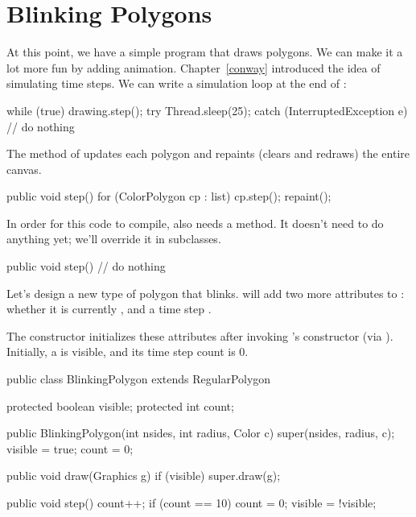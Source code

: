 

\section{Blinking Polygons}
\label{sec:blinking}

At this point, we have a simple program that draws polygons.
We can make it a lot more fun by adding animation.
Chapter~\ref{conway} introduced the idea of simulating time steps.
We can write a simulation loop at the end of :

\begin{code}
while (true) {
    drawing.step();
    try {
        Thread.sleep(25);
    } catch (InterruptedException e) {
        // do nothing
    }
}
\end{code}

The  method of  updates each polygon and repaints (clears and redraws) the entire canvas.

\begin{code}
public void step() {
    for (ColorPolygon cp : list) {
        cp.step();
    }
    repaint();
}
\end{code}

In order for this code to compile,  also needs a  method.
It doesn't need to do anything yet; we'll override it in subclasses.

\begin{code}
public void step() {
    // do nothing
}
\end{code}

Let's design a new type of polygon that blinks.
 will add two more attributes to : whether it is currently , and a time step .

The constructor initializes these attributes after invoking 's constructor (via ).
Initially, a  is visible, and its time step count is 0.

\begin{code}
public class BlinkingPolygon extends RegularPolygon {
    protected boolean visible;
    protected int count;

    public BlinkingPolygon(int nsides, int radius, Color c) {
        super(nsides, radius, c);
        visible = true;
        count = 0;
    }

    public void draw(Graphics g) {
        if (visible) {
            super.draw(g);
        }
    }

    public void step() {
        count++;
        if (count == 10) {
            count = 0;
            visible = !visible;
        }
    }
}
\end{code}


